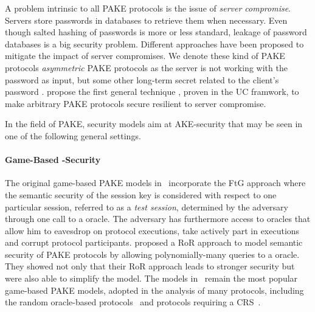 A problem intrinsic to all \ac{PAKE} protocols is the issue of \emph{server compromise}.
Servers store passwords in databases to retrieve them when necessary.
Even though salted hashing of passwords is more or less standard, leakage of password databases is a big security problem.
Different approaches have been proposed to mitigate the impact of server compromises.
We denote these kind of \ac{PAKE} protocols \emph{asymmetric} \ac{PAKE} protocols as the server is not working with the password as input, but some other long-term secret related to the client's password \cite{Wu1998,Boyen2009a}.
\citeauthor{Gentry2006} propose the first general technique \cite{Gentry2006}, proven in the \ac{UC} framwork, to make arbitrary \ac{PAKE} protocols secure resilient to server compromise.

In the field of \acl{PAKE}, security models aim at \ac{AKE}-security \cite{Bellare1993,Bellare1995} that may be seen in one of the following general settings.

\paragraph{Game-Based -Security}
The original game-based \ac{PAKE} models in~\cite{Bellare2000,Boyko2000} incorporate the \ac{FtG} approach where the semantic security of the session key is considered with respect to one particular session, referred to as a \emph{test session}, determined by the adversary through one call to a \Test oracle.
The adversary has furthermore access to oracles that allow him to eavesdrop on protocol executions, take actively part in executions and corrupt protocol participants.
\citeauthor{Abdalla2005} \cite{Abdalla2005} proposed a \ac{RoR} approach to model semantic security of PAKE protocols by allowing polynomially-many queries to a \Test oracle.
They showed not only that their \ac{RoR} approach leads to stronger security but were also able to simplify the model.
The models in~\cite{Bellare2000,Abdalla2005} remain the most popular game-based PAKE models, adopted in the analysis of many protocols, including the random oracle-based protocols~\cite{Abdalla2006,Abdalla2005b} and protocols requiring a \ac{CRS}~\cite{Gennaro2003,Gennaro2008,Katz2009a}.



